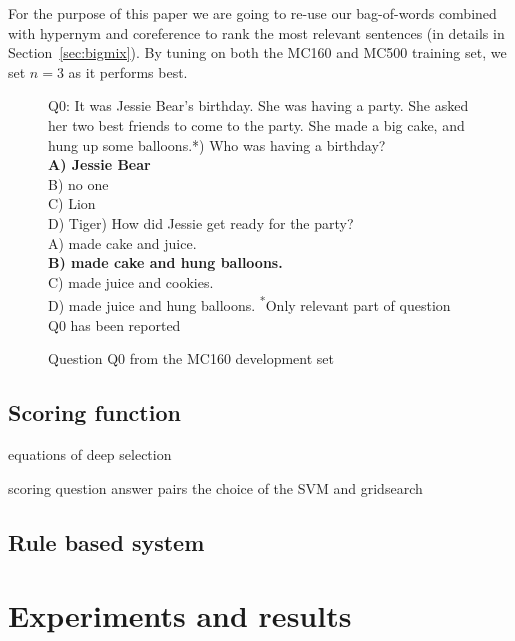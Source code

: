 \documentclass[11pt]{article}
\begin{document}
For the purpose of this paper we are going to re-use our bag-of-words combined with hypernym and coreference to rank the most relevant sentences (in details in Section~\ref{sec:bigmix}).
By tuning on both the {\small MC160} and {\small MC500} training set, we set $n=3$ as it performs best.

\begin{figure}[!th]
\begin{framed}
\begin{flushleft}
{\small Q0}: It was Jessie Bear's birthday. She was having a party.  She asked her two best friends to
come to the party.  She made a big cake, and hung up some balloons.*\newline{}) Who was having a birthday?\\
\textbf{A) Jessie Bear}\\
B) no one\\
C) Lion\\
D) Tiger\newline{}) How did Jessie get ready for the party?\\
A) made cake and juice.\\
\textbf{B) made cake and hung balloons.}\\
C) made juice and cookies.\\
D) made juice and hung balloons.\newline\newline
{\small  \textsuperscript{*}Only relevant part of question {\small Q0} has been reported}
\end{flushleft}
\end{framed}
\caption{\label{fig:mct_example} Question Q0 from the MC160 development set}
\end{figure}

\subsection{Scoring function}
equations of deep selection

scoring question answer pairs
the choice of the SVM and gridsearch
\label{sec:bigmix}

\subsection{Rule based system}
\label{sec:rulebased}

\section{Experiments and results}
\end{document}
